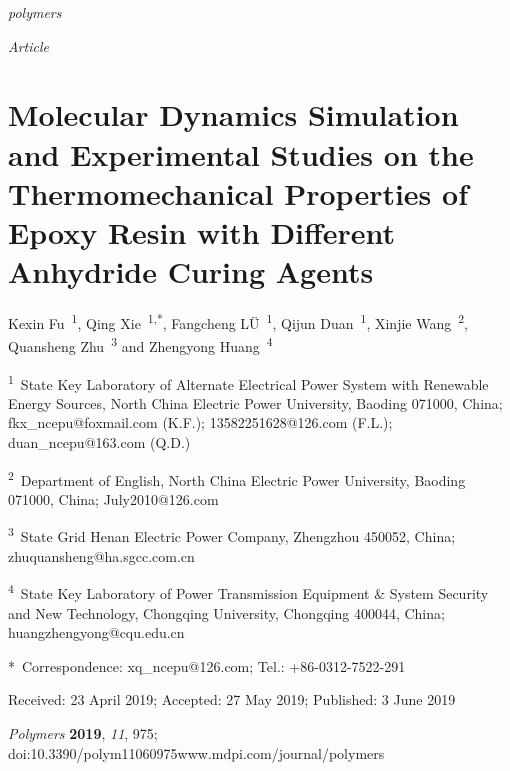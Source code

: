 \documentclass{article}
\begin{document}

\noindent\emph{polymers}\par
\noindent\emph{Article}

\section*{Molecular Dynamics Simulation and Experimental Studies on the Thermomechanical Properties of Epoxy Resin with Different Anhydride Curing Agents}

\noindent Kexin Fu~\textsuperscript{1}, Qing Xie~\textsuperscript{1,*}, Fangcheng LÜ~\textsuperscript{1}, Qijun Duan~\textsuperscript{1}, Xinjie Wang~\textsuperscript{2}, Quansheng Zhu~\textsuperscript{3} and Zhengyong Huang~\textsuperscript{4}

{\small
\begin{hangpars}
\textsuperscript{1}\ State Key Laboratory of Alternate Electrical Power System with Renewable Energy Sources, North China Electric Power University, Baoding 071000, China; fkx\_ncepu@foxmail.com (K.F.); 13582251628@126.com (F.L.); duan\_ncepu@163.com (Q.D.)

\textsuperscript{2}\ Department of English, North China Electric Power University, Baoding 071000, China; July2010@126.com

\textsuperscript{3}\ State Grid Henan Electric Power Company, Zhengzhou 450052, China; zhuquansheng@ha.sgcc.com.cn

\textsuperscript{4}\ State Key Laboratory of Power Transmission Equipment \& System Security and New Technology, Chongqing University, Chongqing 400044, China; huangzhengyong@cqu.edu.cn

*\ Correspondence: xq\_ncepu@126.com; Tel.: +86-0312-7522-291
\end{hangpars}}

\noindent Received: 23 April 2019; Accepted: 27 May 2019; Published: 3 June 2019

\noindent\emph{Polymers} \textbf{2019}, \emph{11}, 975; doi:10.3390/polym11060975\quad www.mdpi.com/journal/polymers
\end{document}
